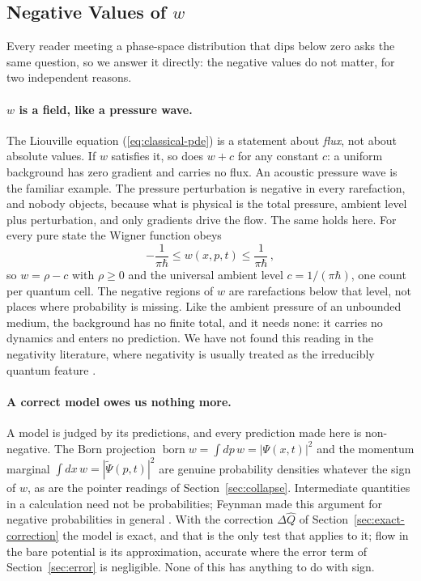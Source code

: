 \documentclass[12pt]{article}
\DeclareMathOperator\born{born}
\begin{document}
\subsection{Negative Values of $w$}\label{sec:positivity}

Every reader meeting a phase-space distribution that dips below zero asks the same question, so we answer it directly: the negative values do not matter, for two independent reasons.

\paragraph{$w$ is a field, like a pressure wave.}
The Liouville equation (\ref{eq:classical-pde}) is a statement about \emph{flux}, not about absolute values.
If $w$ satisfies it, so does $w + c$ for any constant $c$: a uniform background has zero gradient and carries no flux.
An acoustic pressure wave is the familiar example.
The pressure perturbation is negative in every rarefaction, and nobody objects, because what is physical is the total pressure, ambient level plus perturbation, and only gradients drive the flow.
The same holds here.
For every pure state the Wigner function obeys
\begin{equation}
-\frac{1}{\pi\hbar} \leq w(x,p,t) \leq \frac{1}{\pi\hbar} \,,
\end{equation}
so $w = \rho - c$ with $\rho \geq 0$ and the universal ambient level $c = 1/(\pi\hbar)$, one count per quantum cell.
The negative regions of $w$ are rarefactions below that level, not places where probability is missing.
Like the ambient pressure of an unbounded medium, the background has no finite total, and it needs none: it carries no dynamics and enters no prediction.
We have not found this reading in the negativity literature, where negativity is usually treated as the irreducibly quantum feature \cite{kenfack2004}.

\paragraph{A correct model owes us nothing more.}
A model is judged by its predictions, and every prediction made here is non-negative.
The Born projection $\born w = \int dp\, w = |\Psi(x,t)|^2$ and the momentum marginal $\int dx\, w = |\tilde{\Psi}(p,t)|^2$ are genuine probability densities whatever the sign of $w$, as are the pointer readings of Section~\ref{sec:collapse}.
Intermediate quantities in a calculation need not be probabilities; Feynman made this argument for negative probabilities in general \cite{feynman1987}.
With the correction $\Delta\hat{Q}$ of Section~\ref{sec:exact-correction} the model is exact, and that is the only test that applies to it; flow in the bare potential is its approximation, accurate where the error term of Section~\ref{sec:error} is negligible.
None of this has anything to do with sign.
\end{document}
